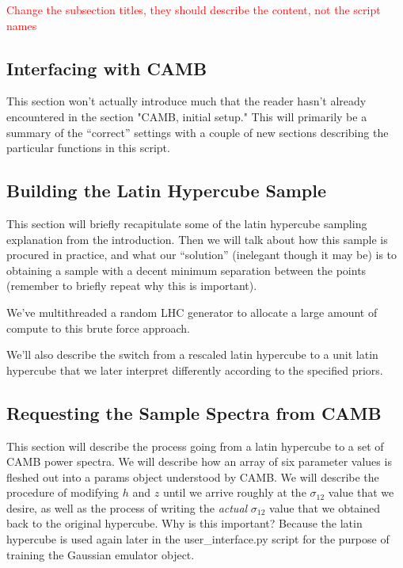 \documentclass[11pt]{article}
\begin{document}
\textcolor{red}{Change the subsection titles, they should describe the content, not the script names}

\begin{centering}
\subsection{Interfacing with CAMB}
\end{centering}


This section won't actually introduce much that the reader hasn't already encountered in the section "CAMB, initial setup." This will primarily be a summary of the ``correct'' settings with a couple of new sections describing the particular functions in this script.

\begin{centering}
\subsection{Building the Latin Hypercube Sample}
\end{centering}


This section will briefly recapitulate some of the latin hypercube sampling explanation from the introduction. Then we will talk about how this sample is procured in practice, and what our ``solution'' (inelegant though it may be) is to obtaining a sample with a decent minimum separation between the points (remember to briefly repeat why this is important).

We've multithreaded a random LHC generator to allocate a large amount of compute to this brute force approach.

We'll also describe the switch from a rescaled latin hypercube to a unit latin hypercube that we later interpret differently according to the specified priors.

\begin{centering}
\subsection{Requesting the Sample Spectra from CAMB}
\end{centering}


This section will describe the process going from a latin hypercube to a set of CAMB power spectra. We will describe how an array of six parameter values is fleshed out into a params object understood by CAMB. We will describe the procedure of modifying $h$ and $z$ until we arrive roughly at the $\sigma_{12}$ value that we desire, as well as the process of writing the \textit{actual} $\sigma_{12}$ value that we obtained back to the original hypercube. Why is this important? Because the latin hypercube is used again later in the user\_interface.py script for the purpose of training the Gaussian emulator object.
\end{document}
